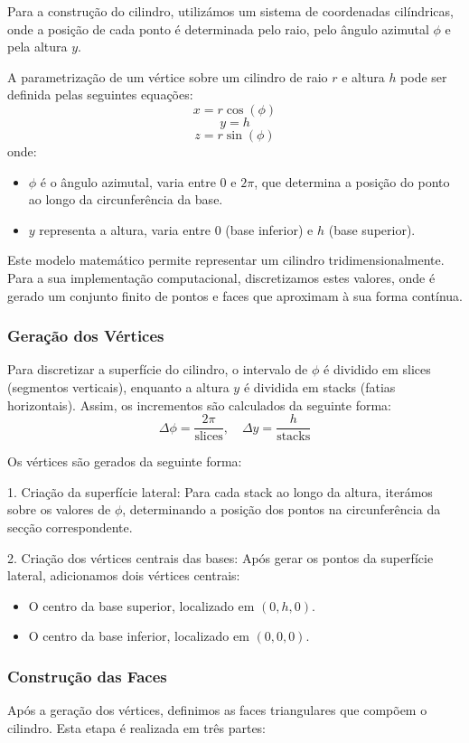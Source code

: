 \documentclass[12pt, a4paper]{article}
\begin{document}
Para a construção do cilindro, utilizámos um sistema de coordenadas cilíndricas, onde a
posição de cada ponto é determinada pelo raio, pelo ângulo azimutal \( \phi \) e
pela altura \( y \).

A parametrização de um vértice sobre um cilindro de raio \( r \) e altura \( h \) pode ser definida
pelas seguintes equações:
\[
x = r \cos(\phi)
\]
\[
y = h
\]
\[
z = r \sin(\phi)
\]
onde:
\begin{itemize}
\item \( \phi \) é o ângulo azimutal, varia entre \( 0 \) e \( 2\pi \), que determina a
posição do ponto ao longo da circunferência da base.
\item \( y \) representa a altura, varia entre \( 0 \) (base inferior) e \( h \)
(base superior).
\end{itemize}

Este modelo matemático permite representar um cilindro tridimensionalmente. Para a sua implementação
computacional, discretizamos estes valores, onde é gerado um conjunto finito de pontos e faces que
aproximam à sua forma contínua.

\subsubsection{Geração dos Vértices}
Para discretizar a superfície do cilindro, o intervalo de \( \phi \) é dividido em slices
(segmentos verticais), enquanto a altura \( y \) é dividida em stacks (fatias horizontais).
Assim, os incrementos são calculados da seguinte forma:
\[
\Delta \phi = \frac{2\pi}{\text{slices}}, \quad \Delta y = \frac{h}{\text{stacks}}
\]

Os vértices são gerados da seguinte forma:

1. Criação da superfície lateral: Para cada stack ao longo da altura, iterámos
sobre os valores de \( \phi \), determinando a posição dos pontos na circunferência da secção
correspondente.

2. Criação dos vértices centrais das bases: Após gerar os pontos da superfície lateral,
adicionamos dois vértices centrais:
\begin{itemize}
\item O centro da base superior, localizado em \( (0, h, 0) \).
\item O centro da base inferior, localizado em \( (0, 0, 0) \).
\end{itemize}

\subsubsection{Construção das Faces}
Após a geração dos vértices, definimos as faces triangulares que compõem o cilindro. Esta etapa
é realizada em três partes:
\end{document}
